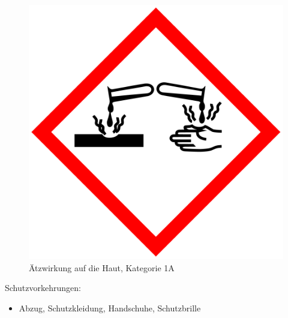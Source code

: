 \begin{figure}[h]
\begin{center}
\begin{minipage}[t]{0.4\textwidth}
\begin{center}
                \label{fig:cdbrandfoerdernd}
            \end{center}
        \end{minipage}
        \hspace{0.025\textwidth}
        \begin{minipage}[t]{0.4\textwidth}
            \begin{center}
                \includegraphics[height=0.1\textheight]{Bilder/Optische_Datentraeger_Die_Compact_Disc/Material_Polycarbonat/cdaetzwirkung.png}
                \caption[Ätzwirkung auf die Haut, Kategorie 1A \newline \url{https://upload.wikimedia.org/wikipedia/commons/a/a1/GHS-pictogram-acid.svg} (zuletzt aufgerufen am 19.09.2015)]{Ätzwirkung auf die Haut, Kategorie 1A}
                \label{fig:cdaetzwirkung}
            \end{center}
        \end{minipage}
    \end{center}
\end{figure}

Schutzvorkehrungen:
\begin{itemize}
    \item Abzug, Schutzkleidung, Handschuhe, Schutzbrille
\end{itemize}

